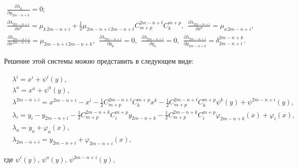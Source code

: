 \begin{gather*}
{\frac{\partial\lambda_a}{\partial y_{2m-n+k}}=0; }\\


%


{\frac{\partial\lambda_{2m-n+i}}{\partial x^k}=\mu_{k\, 2m-n+i}+


\frac{1}{2}\mu_{2m-n+i\, 2m-n+t}C^{2m-n+t}_{m+p}C^{m+p}_k,\ \


\frac{\partial\lambda_{2m-n+i}}{\partial x^a}=\mu_{a\, 2m-n+i},}\\


%


{\frac{\partial\lambda_{2m-n+i}}{\partial x^{2m-


n+k}}=\mu_{2m-n+i\, 2m-n+k},\ \


\frac{\partial\lambda_{2m-n+i}}{\partial y_k}=0,\ \


\frac{\partial\lambda_{2m-n+i}}{\partial y_a}=0,\ \


\frac{\partial\lambda_{2m-n+i}}{\partial y_{2m-n+k}}=\delta^{2m-n+k}_{2m-


n+i}.}


\end{gather*}


Решение этой системы можно представить в следующем виде:


\begin{align*}


&\lambda^i=x^i+\psi^i(y),\\


&\lambda^a=x^a+\psi^a(y),\\


& {\lambda^{2m-n+i}=x^{2m-n+i}-x^i-\frac{1}{2}C^{2m-


n+t}_{m+p}C^{m+p}_k x^k-\frac{1}{2}C^{2m-


n+t}_{m+p}C^{m+p}_k\psi^k(y)+\psi^{2m-n+i}(y),}\\


& {\lambda_i=y_i-y_{2m-n+i}-\frac{1}{2}C^{2m-


n+k}_{m+p}C^{m+p}_iy_{2m-n+k} -\frac{1}{2}C^{2m-


n+k}_{m+p}C^{m+p}_i\varphi_{2m-n+k}(x)+\varphi_i(x),}\\


&\lambda_a=y_a+\varphi_a(x),\\


&\lambda_{2m-n+i}=y_{2m-n+i}+\varphi_{2m-n+i}(x),


\end{align*}


где $\psi^i(y)$, $\psi^a(y)$, $\psi^{2m-n+i}(y)$,


